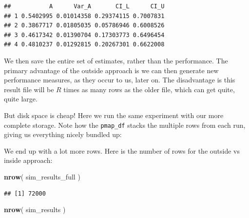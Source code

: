 \documentclass[
]{book}
\newenvironment{Shaded}{\begin{snugshade}}{\end{snugshade}}
\newcommand{\AttributeTok}[1]{\textcolor[rgb]{0.13,0.29,0.53}{#1}}
\newcommand{\DecValTok}[1]{\textcolor[rgb]{0.00,0.00,0.81}{#1}}
\newcommand{\FunctionTok}[1]{\textcolor[rgb]{0.13,0.29,0.53}{\textbf{#1}}}
\newcommand{\NormalTok}[1]{#1}
\newcommand{\OtherTok}[1]{\textcolor[rgb]{0.56,0.35,0.01}{#1}}
\newcommand{\SpecialCharTok}[1]{\textcolor[rgb]{0.81,0.36,0.00}{\textbf{#1}}}
\newcommand{\StringTok}[1]{\textcolor[rgb]{0.31,0.60,0.02}{#1}}
\begin{document}
\begin{verbatim}
##           A      Var_A       CI_L      CI_U
## 1 0.5402995 0.01014358 0.29374115 0.7007831
## 2 0.3867717 0.01805035 0.05786946 0.6008526
## 3 0.4617342 0.01390704 0.17303773 0.6496454
## 4 0.4810237 0.01292815 0.20267301 0.6622008
\end{verbatim}

We then save the entire set of estimates, rather than the performance.
The primary advantage of the outside approach is we can then generate new performance measures, as they
occur to us, later on.
The disadvantage is this result file will be \(R\) times as many rows as the older file, which can get quite, quite large.

But disk space is cheap!
Here we run the same experiment with our more complete storage.
Note how the \texttt{pmap\_df} stacks the multiple rows from each run, giving us everything nicely bundled up:

\begin{Shaded}
\end{Shaded}

We end up with a lot more rows.
Here is the number of rows for the outside vs inside approach:

\begin{Shaded}
\begin{Highlighting}[]
\FunctionTok{nrow}\NormalTok{( sim\_results\_full )}
\end{Highlighting}
\end{Shaded}

\begin{verbatim}
## [1] 72000
\end{verbatim}

\begin{Shaded}
\begin{Highlighting}[]
\FunctionTok{nrow}\NormalTok{( sim\_results )}
\end{Highlighting}
\end{Shaded}
\end{document}
